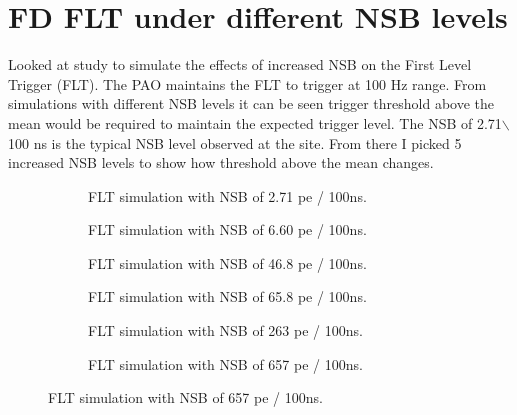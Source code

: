 \section{FD FLT under different NSB levels}

Looked at study to simulate the effects of increased NSB on the First Level Trigger (FLT). The PAO maintains the FLT to trigger at 100 Hz range. From simulations with different NSB levels it can be seen trigger threshold above the mean would be required to maintain the expected trigger level. The NSB of 2.71$\backslash$100 ns is the typical NSB level observed at the site. From there I picked 5 increased NSB levels to show how threshold above the mean changes. 


\begin{figure}
\centering
\begin{subfigure}[b]{0.44\textwidth}
\caption{FLT simulation with NSB of 2.71 pe / 100ns.}
\end{subfigure}
\hspace{3mm}
\begin{subfigure}[b]{0.44\textwidth}
\caption{FLT simulation with NSB of 6.60 pe / 100ns.}
\end{subfigure}

\vspace{3mm}

\begin{subfigure}[b]{0.44\textwidth}
\caption{FLT simulation with NSB of 46.8 pe / 100ns.}
\end{subfigure}
\hspace{3mm}
\begin{subfigure}[b]{0.44\textwidth}
\caption{FLT simulation with NSB of 65.8 pe / 100ns.}
\end{subfigure}

\vspace{3mm}
\begin{subfigure}[b]{0.44\textwidth}
\caption{FLT simulation with NSB of 263 pe / 100ns.}
\end{subfigure}
\hspace{3mm}
\begin{subfigure}[b]{0.44\textwidth}
\caption{FLT simulation with NSB of 657 pe / 100ns.}
\end{subfigure}
\end{figure}
